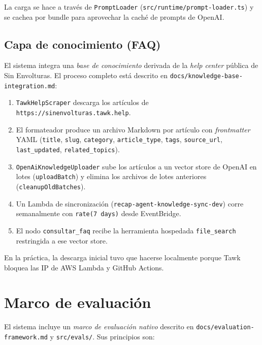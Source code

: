 \documentclass[11pt,a4paper]{article}
\begin{document}
La carga se hace a través de \texttt{PromptLoader}
(\texttt{src/runtime/prompt-loader.ts}) y se cachea por bundle para
aprovechar la caché de prompts de OpenAI.

\subsection{Capa de conocimiento (FAQ)}

El sistema integra una \emph{base de conocimiento} derivada de la
\textit{help center} pública de Sin Envolturas. El proceso completo
está descrito en \texttt{docs/knowledge-base-integration.md}:

\begin{enumerate}[leftmargin=*,itemsep=1pt]
  \item \texttt{TawkHelpScraper} descarga los artículos de
        \texttt{https://sinenvolturas.tawk.help}.
  \item El formateador produce un archivo Markdown por artículo con
        \emph{frontmatter} YAML (\texttt{title}, \texttt{slug},
        \texttt{category}, \texttt{article\_type}, \texttt{tags},
        \texttt{source\_url}, \texttt{last\_updated},
        \texttt{related\_topics}).
  \item \texttt{OpenAiKnowledgeUploader} sube los artículos a un vector
        store de OpenAI en lotes (\texttt{uploadBatch}) y elimina los
        archivos de lotes anteriores (\texttt{cleanupOldBatches}).
  \item Un Lambda de sincronización (\texttt{recap-agent-knowledge-sync-dev})
        corre semanalmente con \texttt{rate(7 days)} desde
        EventBridge.
  \item El nodo \texttt{consultar\_faq} recibe la herramienta
        hospedada \texttt{file\_search} restringida a ese vector
        store.
\end{enumerate}

En la práctica, la descarga inicial tuvo que hacerse localmente porque
Tawk bloquea las IP de AWS Lambda y GitHub Actions.

\section{Marco de evaluación}

El sistema incluye un \emph{marco de evaluación nativo} descrito en
\texttt{docs/evaluation-framework.md} y \texttt{src/evals/}. Sus
principios son:
\end{document}
